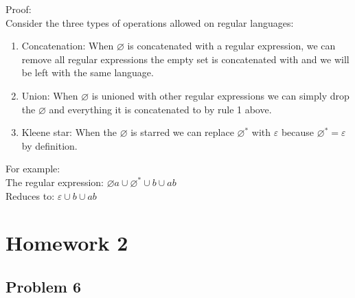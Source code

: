 \documentclass{article}
\begin{document}
\begin{enumerate}[a)]
    Proof: \\
    Consider the three types of operations allowed on regular languages:
    \begin{enumerate}[1)]
    \item Concatenation: When $\varnothing$ is concatenated with a regular expression,
    we can remove all regular expressions the empty set is concatenated with and we will
    be left with the same language.
    \item Union: When $\varnothing$ is unioned with other regular expressions we can
    simply drop the $\varnothing$ and everything it is concatenated to by rule 1 above.
    \item Kleene star: When the $\varnothing$ is starred we can replace $\varnothing^*$ with
    $\varepsilon$ because $\varnothing^* = \varepsilon$ by definition.
    \end{enumerate}
    For example: \\
    The regular expression: $\varnothing a \cup \varnothing^* \cup b \cup ab$ \\
    Reduces to: $\varepsilon \cup b \cup ab$

    \end{enumerate}

    \newpage
    \section*{Homework 2}

    \subsection*{Problem 6}
\end{document}
